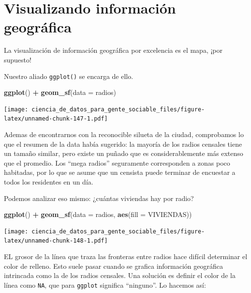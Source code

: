 \documentclass[]{book}
\newenvironment{Shaded}{\begin{snugshade}}{\end{snugshade}}
\newcommand{\KeywordTok}[1]{\textcolor[rgb]{0.13,0.29,0.53}{\textbf{#1}}}
\newcommand{\DataTypeTok}[1]{\textcolor[rgb]{0.13,0.29,0.53}{#1}}
\newcommand{\StringTok}[1]{\textcolor[rgb]{0.31,0.60,0.02}{#1}}
\newcommand{\OperatorTok}[1]{\textcolor[rgb]{0.81,0.36,0.00}{\textbf{#1}}}
\newcommand{\NormalTok}[1]{#1}
\begin{document}
\section{Visualizando información
geográfica}\label{visualizando-informacion-geografica}

La visualización de información geográfica por excelencia es el mapa,
¡por supuesto!

Nuestro aliado \texttt{ggplot()} se encarga de ello.

\begin{Shaded}
\begin{Highlighting}[]
\KeywordTok{ggplot}\NormalTok{() }\OperatorTok{+}\StringTok{ }\KeywordTok{geom_sf}\NormalTok{(}\DataTypeTok{data =}\NormalTok{ radios)}
\end{Highlighting}
\end{Shaded}

\texttt{[image: ciencia\_de\_datos\_para\_gente\_sociable\_files/figure-latex/unnamed-chunk-147-1.pdf]}

Ademas de encontrarnos con la reconocible silueta de la ciudad,
comprobamos lo que el resumen de la data había sugerido: la mayoría de
los radios censales tiene un tamaño similar, pero existe un puñado que
es considerablemente más extenso que el promedio. Los ``mega radios''
seguramente corresponden a zonas poco habitadas, por lo que se asume que
un censista puede terminar de encuestar a todos los residentes en un
día.

Podemos analizar eso mismo: ¿cuántas viviendas hay por radio?

\begin{Shaded}
\begin{Highlighting}[]
\KeywordTok{ggplot}\NormalTok{() }\OperatorTok{+}\StringTok{ }\KeywordTok{geom_sf}\NormalTok{(}\DataTypeTok{data =}\NormalTok{ radios, }\KeywordTok{aes}\NormalTok{(}\DataTypeTok{fill =}\NormalTok{ VIVIENDAS)) }
\end{Highlighting}
\end{Shaded}

\texttt{[image: ciencia\_de\_datos\_para\_gente\_sociable\_files/figure-latex/unnamed-chunk-148-1.pdf]}

EL grosor de la línea que traza las fronteras entre radios hace difícil
determinar el color de relleno. Esto suele pasar cuando se grafica
información geográfica intrincada como la de los radios censales. Una
solución es definir el color de la línea como \texttt{NA}, que para
\texttt{ggplot} significa ``ninguno''. Lo hacemos así:
\end{document}
